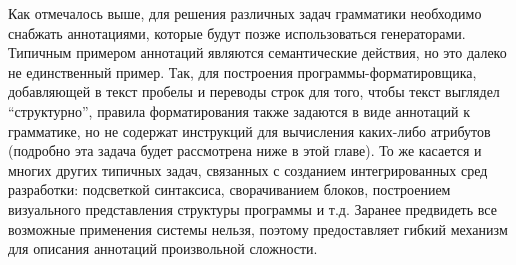Как отмечалось выше, для решения различных задач грамматики необходимо снабжать аннотациями, которые будут позже использоваться генераторами. Типичным примером аннотаций являются семантические действия, но это далеко не единственный пример. Так, для построения программы-форматировщика, добавляющей в текст пробелы и переводы строк для того, чтобы текст выглядел ``структурно'', правила форматирования также задаются в виде аннотаций к грамматике, но не содержат инструкций для вычисления каких-либо атрибутов (подробно эта задача будет рассмотрена ниже в этой главе). То же касается и многих других типичных задач, связанных с созданием интегрированных сред разработки: подсветкой синтаксиса, сворачиванием блоков, построением визуального представления структуры программы и т.д. Заранее предвидеть все возможные применения системы нельзя, поэтому  предоставляет гибкий механизм для описания аннотаций произвольной сложности.

